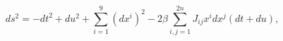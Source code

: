 \begin{equation}
\label{aftercoM}
ds^2 = - dt^2 + du^2 + \sum_{i=1}^9 (dx^i)^2 
- 2\beta \sum_{i,j=1}^{2n} J_{ij} x^i dx^j (dt+du),
\end{equation}

